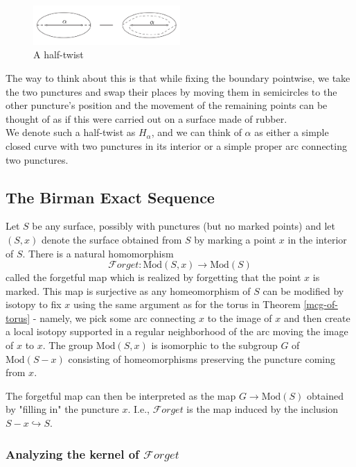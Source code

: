 \documentclass[reqno]{amsart}
\theoremstyle{definition}
\theoremstyle{remark}
\newcommand{\Mod}{{\mathrm{Mod}}}
\newcommand{\Forget}{{\mathcal{F}}orget}
\begin{document}
\begin{figure}[htpb]
    \centering
    \includegraphics[width=0.5\textwidth]{half-twist.png}
    \caption{A half-twist}
    \label{fig:half-twist-png}
\end{figure}

The way to think about this is that while fixing the boundary
pointwise, we take the two punctures and swap their places
by moving them in semicircles to the other puncture's position and
the movement of the remaining points can be
thought of as if this were carried out on
a surface made of rubber.\\


We denote such a half-twist as $H_{\alpha}$, and we
can think of $\alpha$ as either a simple closed
curve with two punctures in its interior or a simple
proper arc connecting two punctures.


\subsection{The Birman Exact Sequence}

Let $S$ be any surface, possibly with punctures (but no 
marked points) and let
$\left( S, x \right) $ denote the surface obtained
from $S$ by marking a point $x$ in the
interior of $S$. There is a natural
homomorphism
\[
\Forget \colon \Mod \left( S, x \right) \to \Mod(S)
\] 
called the forgetful map which is realized by forgetting
that the point $x$ is marked. This map is
surjective as any homeomorphism of $S$ can
be modified by isotopy to fix $x$ using the same
argument as for the torus in Theorem \ref{mcg-of-torus} - namely,
we pick some arc connecting $x$ to the image of $x$ and
then create a local isotopy supported
in a regular neighborhood of the arc moving the image of $x$ to
$x$. The
group $\Mod(S,x)$ is isomorphic to the
subgroup $G$ of $\Mod \left( S - x \right) $ 
consisting of homeomorphisms preserving the
puncture coming from $x$.

The forgetful map can then be interpreted
as the map $G \to \Mod(S)$ obtained by "filling in" the
puncture $x$. I.e., $\Forget$ is the map
induced by the inclusion
 $S -x \hookrightarrow S$.



 

 \subsubsection{Analyzing the kernel of $\Forget$}
\end{document}
